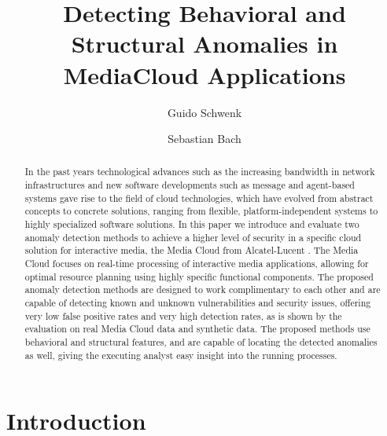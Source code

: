 \documentclass{llncs}
\title{Detecting Behavioral and Structural Anomalies in MediaCloud Applications}
\author{Guido Schwenk \and Sebastian Bach}
\institute{	Technische Universit\"at Berlin, Marchstr. 23, 10587 Berlin}
\begin{document}
\maketitle



\begin{abstract}
In the past years technological advances such as the increasing bandwidth in network infrastructures and new software developments such as message and agent-based systems gave rise to the field of cloud technologies, which have evolved from abstract concepts to concrete solutions, ranging from flexible, platform-independent systems to highly specialized software solutions. In this paper we introduce and evaluate two anomaly detection methods to achieve a higher level of security in a specific cloud solution for interactive media, the Media Cloud from Alcatel-Lucent \cite{CucObeSteDomMul13}. The Media Cloud focuses on real-time processing of interactive media applications, allowing for optimal resource planning using highly specific functional components. The proposed anomaly detection methods are designed to work complimentary to each other and are capable of detecting known and unknown vulnerabilities and security issues, offering very low false positive rates and very high detection rates, as is shown by the evaluation on real Media Cloud data and synthetic data. The proposed methods use behavioral and structural features, and are capable of locating the detected anomalies as well, giving the executing analyst easy insight into the running processes.
\end{abstract}

\section{Introduction}
\label{introduction}
\end{document}
